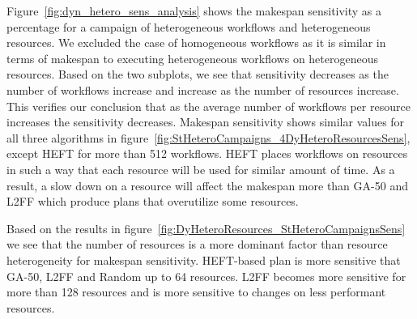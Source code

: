 Figure~\ref{fig:dyn_hetero_sens_analysis} shows the makespan sensitivity as a percentage for a campaign of heterogeneous workflows and heterogeneous resources.
We excluded the case of homogeneous workflows as it is similar in terms of makespan to executing heterogeneous workflows on heterogeneous resources.
Based on the two subplots, we see that sensitivity decreases as the number of workflows increase and increase as the number of resources increase.
This verifies our conclusion that as the average number of workflows per resource increases the sensitivity decreases.
Makespan sensitivity shows similar values for all three algorithms in figure~\ref{fig:StHeteroCampaigns_4DyHeteroResourcesSens}, except HEFT for more than 512 workflows.
HEFT places workflows on resources in such a way that each resource will be used for similar amount of time.
As a result, a slow down on a resource will affect the makespan more than GA-50 and L2FF which produce plans that overutilize some resources.

Based on the results in figure~\ref{fig:DyHeteroResources_StHeteroCampaignsSens} we see that the number of resources is a more dominant factor than resource heterogeneity for makespan sensitivity.
HEFT-based plan is more sensitive that GA-50, L2FF and Random up to 64 resources.
L2FF becomes more sensitive for more than 128 resources and is more sensitive to changes on less performant resources.

